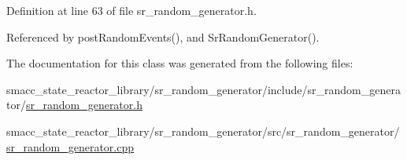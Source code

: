Definition at line 63 of file sr\+\_\+random\+\_\+generator.\+h.



Referenced by post\+Random\+Events(), and Sr\+Random\+Generator().



The documentation for this class was generated from the following files\+:\begin{DoxyCompactItemize}
\item 
smacc\+\_\+state\+\_\+reactor\+\_\+library/sr\+\_\+random\+\_\+generator/include/sr\+\_\+random\+\_\+generator/\hyperlink{sr__random__generator_8h}{sr\+\_\+random\+\_\+generator.\+h}\item 
smacc\+\_\+state\+\_\+reactor\+\_\+library/sr\+\_\+random\+\_\+generator/src/sr\+\_\+random\+\_\+generator/\hyperlink{sr__random__generator_8cpp}{sr\+\_\+random\+\_\+generator.\+cpp}\end{DoxyCompactItemize}

